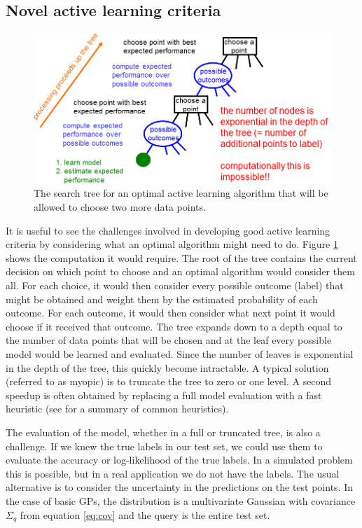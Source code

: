 \documentclass[useAMS,usenatbib,tightenlines,11pt,preprint]{aastex}
\begin{document}
\subsection{Novel active learning criteria}

\begin{figure}[t]
\centerline{\includegraphics[scale=0.4]{searchtree.png}}
\caption{The search tree for an optimal active learning algorithm that will
  be allowed to choose two more data points.}
\label{fig:searchtree}
\end{figure}

It is useful to see the challenges involved in developing good active
learning criteria by considering what an optimal algorithm might need to
do.  Figure \ref{fig:searchtree} shows the computation it would require.
The root of the tree contains the current decision on which point to choose
and an optimal algorithm would consider them all.  For each choice, it
would then consider every possible outcome (label) that might be obtained
and weight them by the estimated probability of each outcome.  For each
outcome, it would then consider what next point it would choose if it
received that outcome.  The tree expands down to a depth equal to the
number of data points that will be chosen and at the leaf every possible
model would be learned and evaluated.  Since the number of leaves is
exponential in the depth of the tree, this quickly become intractable.  A
typical solution (referred to as myopic) is to truncate the tree to zero or
one level.  A second speedup is often obtained by replacing a full model
evaluation with a fast heuristic (see \cite{Settles09} for a summary of
common heuristics).

The evaluation of the model, whether in a full or truncated tree, is also a
challenge.  If we knew the true labels in our test set, we could use them
to evaluate the accuracy or log-likelihood of the true labels.  In a
simulated problem this is possible, but in a real application we do not
have the labels.  The usual alternative is to consider the uncertainty in
the predictions on the test points.  In the case of basic GPs, the
distribution is a multivariate Gaussian with covariance $\Sigma_q$ from
equation \ref{eq:cov} and the query is the entire test set.
\end{document}
